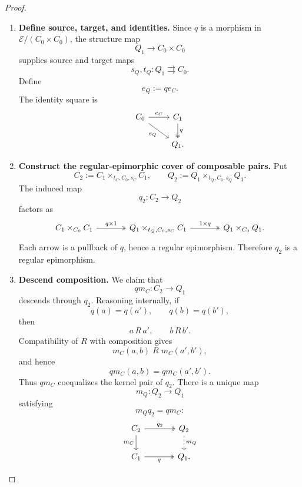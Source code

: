\begin{proof}
    \leavevmode
    \begin{enumerate}
        \item \textbf{Define source, target, and identities.}
        Since \(q\) is a morphism in
        \(\mathcal E/(C_0\times C_0)\), the structure map
        \[
            Q_1\to C_0\times C_0
        \]
        supplies source and target maps
        \[
            s_Q,t_Q:Q_1\rightrightarrows C_0.
        \]
        Define
        \[
            e_Q:=q e_C.
        \]
        The identity square is
        \[
        \begin{tikzcd}
            C_0
                \arrow[r, "e_C"]
                \arrow[dr, "e_Q"']
            &
            C_1
                \arrow[d, two heads, "q"]
            \\
            &
            Q_1.
        \end{tikzcd}
        \]

        \item \textbf{Construct the regular-epimorphic cover of composable pairs.}
        Put
        \[
            C_2
            :=
            C_1\times_{t_C,C_0,s_C}C_1,
            \qquad
            Q_2
            :=
            Q_1\times_{t_Q,C_0,s_Q}Q_1.
        \]
        The induced map
        \[
            q_2:C_2\to Q_2
        \]
        factors as
        \[
        \begin{tikzcd}[column sep=large]
            C_1\times_{C_0}C_1
                \arrow[r, two heads, "q\times1"]
            &
            Q_1\times_{t_Q,C_0,s_C}C_1
                \arrow[r, two heads, "1\times q"]
            &
            Q_1\times_{C_0}Q_1.
        \end{tikzcd}
        \]
        Each arrow is a pullback of \(q\), hence a regular epimorphism.
        Therefore \(q_2\) is a regular epimorphism.

        \item \textbf{Descend composition.}
        We claim that
        \[
            q m_C:C_2\to Q_1
        \]
        descends through \(q_2\). Reasoning internally, if
        \[
            q(a)=q(a'),
            \qquad
            q(b)=q(b'),
        \]
        then
        \[
            a\,R\,a',
            \qquad
            b\,R\,b'.
        \]
        Compatibility of \(R\) with composition gives
        \[
            m_C(a,b)\;R\;m_C(a',b'),
        \]
        and hence
        \[
            q m_C(a,b)=q m_C(a',b').
        \]
        Thus \(q m_C\) coequalizes the kernel pair of \(q_2\). There is a
        unique map
        \[
            m_Q:Q_2\to Q_1
        \]
        satisfying
        \[
            m_Qq_2=q m_C:
        \]
        \[
        \begin{tikzcd}[column sep=large]
            C_2
                \arrow[r, two heads, "q_2"]
                \arrow[d, "m_C"']
            &
            Q_2
                \arrow[d, dashed, "m_Q"]
            \\
            C_1
                \arrow[r, two heads, "q"']
            &
            Q_1.
        \end{tikzcd}
        \]


\end{enumerate}
\end{proof}
